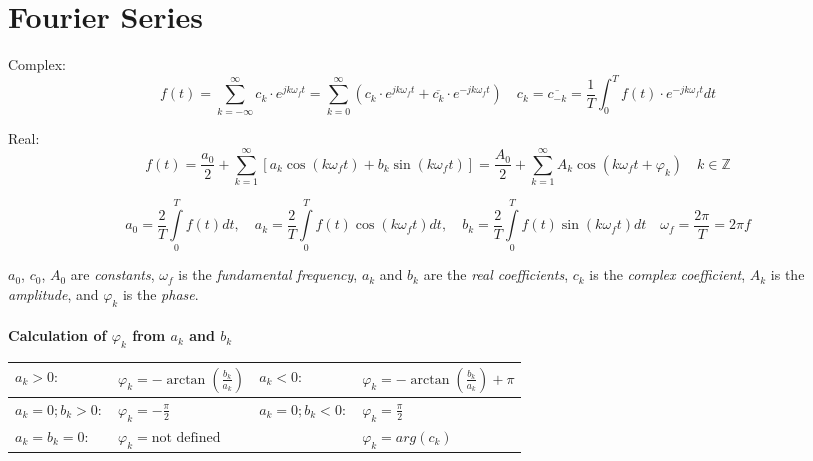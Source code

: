 \section{Fourier Series}
  	Complex: $$\boxed{f(t) = \sum\limits_{k = -\infty}^{\infty} c_k \cdot e^{j k
  	\omega_f t}}= \sum\limits_{k = 0}^{\infty} \left(c_k \cdot e^{j k \omega_f
  	t} + \overline{c_k} \cdot e^{-j k \omega_f t}\right) \quad
  	\boxed{c_k=\overline{c_{-k}}=\frac{1}{T}\int_0^T{f(t)\cdot
	e^{-jk\omega_f t}dt}}$$

	\vspace{0.5cm}

  	Real: $$\boxed{f(t) = \frac{a_0}{2} + \sum\limits_{k=1}^{\infty} \left[a_k
  	\cos(k \omega_f t) + b_k \sin(k \omega_f t)\right]}=\frac{A_0}{2} +
  	\sum\limits_{k=1}^{\infty} A_k \cos(k \omega_f t + \varphi_k) \quad k\in
  	\mathbb{Z}$$

	$$\boxed{a_0 =
	\frac{2}{T}\int\limits_0^{T} f(t)dt, \quad a_k = \frac{2}{T}\int\limits_0^{T} f(t)\cos(k \omega_f t) dt, \quad b_k =
	\frac{2}{T}\int\limits_0^{T} f(t)\sin(k \omega_f t) dt} \quad
	\boxed{\omega_f=\frac{2 \pi}{T}=2 \pi f}$$

	\vspace{0.5cm}

	$a_0$, $c_0$, $A_0$ are \textit{constants}, $\omega_f$ is the
	\textit{fundamental frequency}, $a_k$ and $b_k$ are the \textit{real coefficients},
	$c_k$ is the \textit{complex coefficient}, $A_k$ is the \textit{amplitude},
	and $\varphi_k$ is the \textit{phase}.\\
	\\

	\textbf{Calculation of $\varphi_k$ from $a_k$ and $b_k$}\\
	\begin{tabular}{|p{4cm}p{4cm}|p{3cm}p{3.5cm}|}
		\hline
		$a_k> 0:$ & $\varphi_k = -\arctan(\frac{b_k}{a_k})$ &
		$a_k<0:$ &	$\varphi_k = -\arctan(\frac{b_k}{a_k}) + \pi$\\
		\hline
		$a_k = 0; b_k > 0:$ &	$\varphi_k = -\frac{\pi}{2}$ &
		$a_k = 0; b_k < 0:$ &	$\varphi_k = \frac{\pi}{2}$\\
		\hline
		$a_k = b_k = 0:$ &	$\varphi_k = \text{not defined}$ & & $\varphi_k =
		arg(c_k)$\\
		\hline
	\end{tabular}


